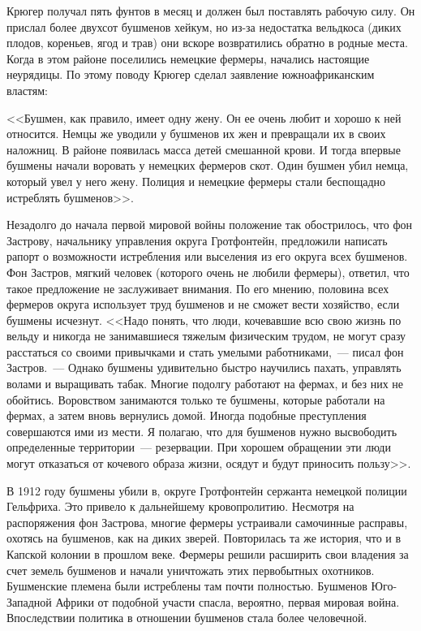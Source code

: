 \documentclass[12pt,a4paper,twoside,openany,svgnames]{memoir}
\begin{document}
Крюгер получал пять фунтов в месяц и должен был поставлять рабочую силу. Он прислал более двухсот бушменов хейкум, но из-за недостатка вельдкоса (диких плодов, кореньев, ягод и трав) они вскоре возвратились обратно в родные места. Когда в этом районе поселились немецкие фермеры, начались настоящие неурядицы. По этому поводу Крюгер сделал заявление южноафриканским властям:

<<Бушмен, как правило, имеет одну жену. Он ее очень любит и хорошо к ней относится. Немцы же уводили у бушменов их жен и превращали их в своих наложниц. В районе появилась масса детей смешанной крови. И тогда впервые бушмены начали воровать у немецких фермеров скот. Один бушмен убил немца, который увел у него жену. Полиция и немецкие фермеры стали беспощадно истреблять бушменов>>.

Незадолго до начала первой мировой войны положение так обострилось, что фон Застрову, начальнику управления округа Гротфонтейн, предложили написать рапорт о возможности истребления или выселения из его округа всех бушменов. Фон Застров, мягкий человек (которого очень не любили фермеры), ответил, что такое предложение не заслуживает внимания. По его мнению, половина всех фермеров округа использует труд бушменов и не сможет вести хозяйство, если бушмены исчезнут. <<Надо понять, что люди, кочевавшие всю свою жизнь по вельду и никогда не занимавшиеся тяжелым физическим трудом, не могут сразу расстаться со своими привычками и стать умелыми работниками,~--- писал фон Застров.~--- Однако бушмены удивительно быстро научились пахать, управлять волами и выращивать табак. Многие подолгу работают на фермах, и без них не обойтись. Воровством занимаются только те бушмены, которые работали на фермах, а затем вновь вернулись домой. Иногда подобные преступления совершаются ими из мести. Я полагаю, что для бушменов нужно высвободить определенные территории~--- резервации. При хорошем обращении эти люди могут отказаться от кочевого образа жизни, осядут и будут приносить пользу>>.

В 1912 году бушмены убили в, округе Гротфонтейн сержанта немецкой полиции Гельфриха. Это привело к дальнейшему кровопролитию. Несмотря на распоряжения фон Застрова, многие фермеры устраивали самочинные расправы, охотясь на бушменов, как на диких зверей. Повторилась та же история, что и в Капской колонии в прошлом веке. Фермеры решили расширить свои владения за счет земель бушменов и начали уничтожать этих первобытных охотников. Бушменские племена были истреблены там почти полностью. Бушменов Юго-Западной Африки от подобной участи спасла, вероятно, первая мировая война. Впоследствии политика в отношении бушменов стала более человечной.
\end{document}
